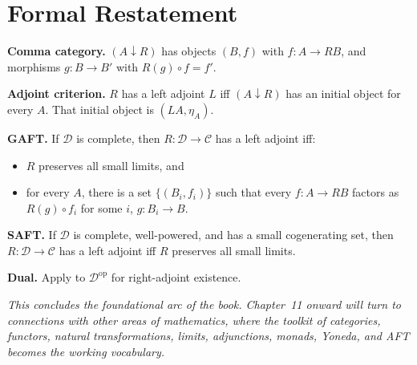 \section*{Formal Restatement}

\begin{formalrestatement}
\textbf{Comma category.}\quad
$(A \downarrow R)$ has objects $(B, f)$ with $f : A \to R B$, and
morphisms $g : B \to B'$ with $R(g) \circ f = f'$.

\medskip
\textbf{Adjoint criterion.}\quad
$R$ has a left adjoint $L$ iff $(A \downarrow R)$ has an initial object
for every $A$. That initial object is $(L A, \eta_A)$.

\medskip
\textbf{GAFT.}\quad
If $\mathcal{D}$ is complete, then $R : \mathcal{D} \to \mathcal{C}$ has
a left adjoint iff:
\begin{itemize}
  \item $R$ preserves all small limits, and
  \item for every $A$, there is a set $\{(B_i, f_i)\}$ such that every
        $f : A \to R B$ factors as $R(g) \circ f_i$ for some $i$,
        $g : B_i \to B$.
\end{itemize}

\medskip
\textbf{SAFT.}\quad
If $\mathcal{D}$ is complete, well-powered, and has a small cogenerating
set, then $R : \mathcal{D} \to \mathcal{C}$ has a left adjoint iff $R$
preserves all small limits.

\medskip
\textbf{Dual.}\quad
Apply to $\mathcal{D}^{\mathrm{op}}$ for right-adjoint existence.

\medskip
\noindent\textit{This concludes the foundational arc of the book.
Chapter~11 onward will turn to connections with other areas of
mathematics, where the toolkit of categories, functors, natural
transformations, limits, adjunctions, monads, Yoneda, and AFT becomes
the working vocabulary.}
\end{formalrestatement}
